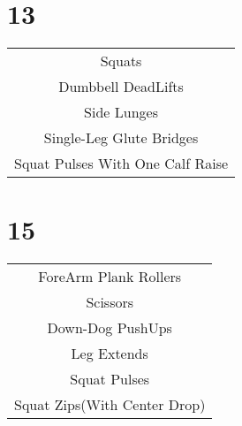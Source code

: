 \documentclass[12pt]{article}
\newcommand\myPadding{1.5}
\begin{document}
\section{13}


\begin{center}
  \bgroup
  \def\arraystretch{\myPadding}%
  \begin{tabular}{ c  }
  Squats
  \\
  Dumbbell DeadLifts
  \\
  Side Lunges
  \\
  Single-Leg Glute Bridges
  \\
  Squat Pulses With One Calf Raise
  \end{tabular}
  \egroup
\end{center}







\section{15}


\begin{center}
  \bgroup
  \def\arraystretch{\myPadding}%
  \begin{tabular}{ c  }
  ForeArm Plank Rollers
  \\
  Scissors
  \\
  Down-Dog PushUps
  \\
  Leg Extends
  \\
  Squat Pulses
  \\
  Squat Zips(With Center Drop)
  \end{tabular}
  \egroup
\end{center}
\end{document}
